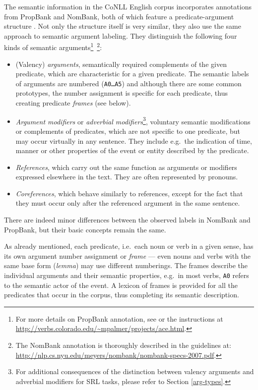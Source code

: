\documentclass[12pt,notitlepage,a4paper]{report}
\begin{document}
The semantic information in the CoNLL English corpus incorporates annotations from PropBank and NomBank, both of which feature a predicate-argument structure \citep[cf.\ Section \ref{problem} and][]{kingsbury02}. Not only the structure itself is very similar, they also use the same approach to semantic argument labeling. They distinguish the following four kinds of semantic arguments\footnote{For more details on PropBank annotation, see \citep{moreda06} or the instructions at \url{http://verbs.colorado.edu/~mpalmer/projects/ace.html}.}~\footnote{The NomBank annotation is thoroughly described in the guidelines at: \\ \url{http://nlp.cs.nyu.edu/meyers/nombank/nombank-specs-2007.pdf}.}:
\begin{itemize}
    \item (Valency) \emph{arguments}, semantically required complements of the given predicate, which are characteristic for a given predicate. The semantic labels of arguments are numbered (\texttt{A0\dots A5}) and although there are some common prototypes, the number assignment is specific for each predicate, thus creating predicate \emph{frames} (see below).
    \item \emph{Argument modifiers} or \emph{adverbial modifiers}\footnote{For additional consequences of the distinction between valency arguments and adverbial modifiers for SRL tasks, please refer to Section \ref{arg-types}.}, voluntary semantic modifications or complements of predicates, which are not specific to one predicate, but may occur virtually in any sentence. They include e.g.\ the indication of time, manner or other properties of the event or entity described by the predicate.
    \item \emph{References}, which carry out the same function as arguments or modifiers expressed elsewhere in the text. They are often represented by pronouns.
    \item \emph{Coreferences}, which behave similarly to references, except for the fact that they must occur only after the referenced argument in the same sentence.
\end{itemize}
There are indeed minor differences between the observed labels in NomBank and PropBank, but their basic concepts remain the same.

As already mentioned, each predicate, i.e.\ each noun or verb in a given sense, has its own argument number assignment or \emph{frame} --- even nouns and verbs with the same base form (\emph{lemma}) may use different numberings. The frames describe the individual arguments and their semantic properties, e.g.\ in most verbs, \texttt{A0} refers to the semantic actor of the event. A lexicon of frames is provided for all the predicates that occur in the corpus, thus completing its semantic description.
\end{document}
